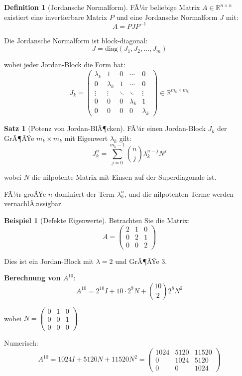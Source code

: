 ﻿\documentclass[a4paper,12pt]{report}
\theoremstyle{definition}
\newtheorem{definition}{Definition}
\newtheorem{beispiel}{Beispiel}
\newtheorem{satz}{Satz}
\begin{document}
	\begin{definition}[Jordansche Normalform]
		FÃ¼r beliebige Matrix $A \in \mathbb{R}^{n \times n}$ existiert eine invertierbare Matrix $P$ und eine Jordansche Normalform $J$ mit:
		\[
		A = P J P^{-1}
		\]
		
		Die Jordansche Normalform ist block-diagonal:
		\[
		J = \text{diag}(J_1, J_2, \ldots, J_m)
		\]
		
		wobei jeder Jordan-Block die Form hat:
		\[
		J_k = \begin{pmatrix}
			\lambda_k & 1 & 0 & \cdots & 0 \\
			0 & \lambda_k & 1 & \cdots & 0 \\
			\vdots & \vdots & \ddots & \ddots & \vdots \\
			0 & 0 & 0 & \lambda_k & 1 \\
			0 & 0 & 0 & 0 & \lambda_k
		\end{pmatrix} \in \mathbb{R}^{m_k \times m_k}
		\]
	\end{definition}
	
	\begin{satz}[Potenz von Jordan-BlÃ¶cken]
		FÃ¼r einen Jordan-Block $J_k$ der GrÃ¶ÃŸe $m_k \times m_k$ mit Eigenwert $\lambda_k$ gilt:
		\[
		J_k^n = \sum_{j=0}^{m_k-1} \binom{n}{j} \lambda_k^{n-j} N^j
		\]
		
		wobei $N$ die nilpotente Matrix mit Einsen auf der Superdiagonale ist.
		
		FÃ¼r groÃŸe $n$ dominiert der Term $\lambda_k^n$, und die nilpotenten Terme werden vernachlÃ¤ssigbar.
	\end{satz}
	
	\begin{beispiel}[Defekte Eigenwerte]
		Betrachten Sie die Matrix:
		\[
		A = \begin{pmatrix}
			2 & 1 & 0 \\
			0 & 2 & 1 \\
			0 & 0 & 2
		\end{pmatrix}
		\]
		
		Dies ist ein Jordan-Block mit $\lambda = 2$ und GrÃ¶ÃŸe 3.
		
		\textbf{Berechnung von $A^{10}$}:
		\[
		A^{10} = 2^{10} I + 10 \cdot 2^9 N + \binom{10}{2} 2^8 N^2
		\]
		
		wobei $N = \begin{pmatrix} 0 & 1 & 0 \\ 0 & 0 & 1 \\ 0 & 0 & 0 \end{pmatrix}$.
		
		Numerisch:
		\[
		A^{10} = 1024 I + 5120 N + 11520 N^2 = \begin{pmatrix}
			1024 & 5120 & 11520 \\
			0 & 1024 & 5120 \\
			0 & 0 & 1024
		\end{pmatrix}
		\]
	\end{beispiel}
	
\end{document}
